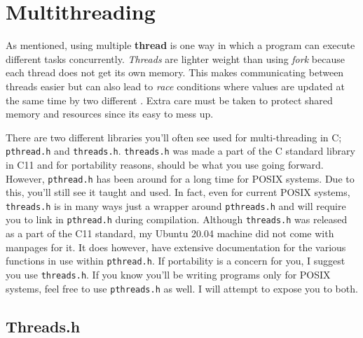 \documentclass[../main.tex]{subfiles}
\begin{document}
	\section{Multithreading}
	
	As mentioned, using multiple \textbf{thread} is one way in which a program can execute different tasks concurrently.  \textit{Threads} are lighter weight than using \textit{fork} because each thread does not get its own memory.  This makes communicating between threads easier but can also lead to \textit{race} conditions where values are updated at the same time by two different .  Extra care must be taken to protect shared memory and resources since its easy to mess up.
	
	There are two different libraries you'll often see used for multi-threading in C; \texttt{pthread.h} and \texttt{threads.h}.  \texttt{threads.h} was made a part of the C standard library in C11 and for portability reasons, should be what you use going forward.  However, \texttt{pthread.h} has been around for a long time for POSIX systems.  Due to this, you'll still see it taught and used.  In fact, even for current POSIX systems, \texttt{threads.h} is in many ways just a wrapper around \texttt{pthreads.h} and will require you to link in \texttt{pthread.h} during compilation.  Although \texttt{threads.h} was released as a part of the C11 standard, my Ubuntu 20.04 machine did not come with manpages for it.  It does however, have extensive documentation for the various functions in use within \texttt{pthread.h}.  If portability is a concern for you, I suggest you use \texttt{threads.h}.  If you know you'll be writing programs only for POSIX systems, feel free to use \texttt{pthreads.h} as well.  I will attempt to expose you to both.\\
	
	
	\subsection{Threads.h}
	
\end{document}
